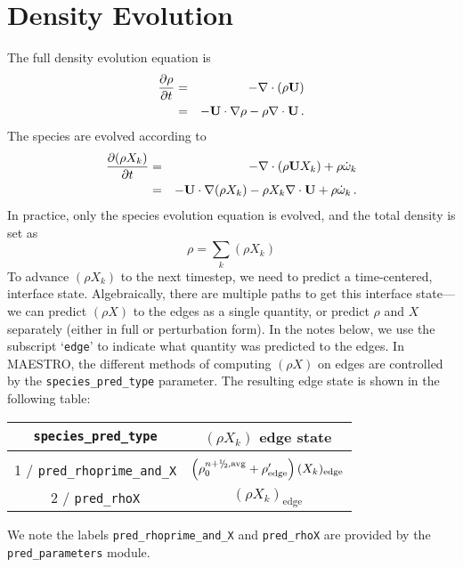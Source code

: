 
\section{Density Evolution}
The full density evolution equation is
\begin{eqnarray}
\frac{\partial\rho}{\partial t} &=& -\nabla\cdot(\rho{\bf U}) \nonumber \\
&=& -{\bf U}\cdot\nabla\rho - \rho\nabla\cdot{\bf U} \, . \label{rho equation}
\end{eqnarray}
The species are evolved according to
\begin{eqnarray}
\frac{\partial(\rho X_k)}{\partial t} &=& -\nabla\cdot(\rho{\bf U} X_k) + \rho \dot{\omega}_k \nonumber \\
&=& -{\bf U}\cdot\nabla(\rho X_k) - \rho X_k \nabla\cdot{\bf U} + \rho \dot{\omega}_k \, . \label{species equation}
\end{eqnarray}
In practice, only the species evolution equation is evolved, and the
total density is set as
\begin{equation}
\rho = \sum_k (\rho X_k)
\end{equation}
To advance $(\rho X_k)$ to the next timestep, we need to predict a
time-centered, interface state.  Algebraically, there are multiple
paths to get this interface state---we can predict $(\rho X)$ to the
edges as a single quantity, or predict $\rho$ and $X$ separately
(either in full or perturbation form).  In the notes below, we use the
subscript `{\tt edge}' to indicate what quantity was predicted to the
edges.  In MAESTRO, the different methods of computing $(\rho X)$ on
edges are controlled by the {\tt species\_pred\_type} parameter.  The
resulting edge state is shown in the following table:

\begin{table}[h]
\centering
\begin{tabular}{c|c}
\hline
\hline
{\tt species\_pred\_type} &   {$(\rho X_k)$ edge state} \\
\hline \\[-3mm]
1 / {\tt pred\_rhoprime\_and\_X}  &  $\left(\rho_0^{n+\myhalf,{\rm avg}}
+ \rho'_\mathrm{edge} \right)(X_k)_\mathrm{edge}$ \\[2mm]
2 / {\tt pred\_rhoX}  &  $(\rho X_k)_\mathrm{edge}$ \\
\hline
\end{tabular}
\end{table}
We note the labels {\tt pred\_rhoprime\_and\_X} and {\tt pred\_rhoX} are
provided by the {\tt pred\_parameters} module.



